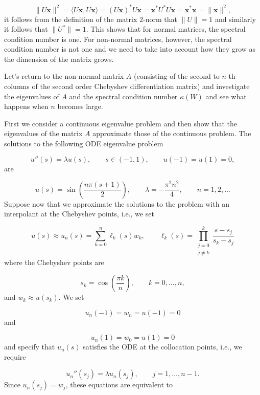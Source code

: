 \documentclass[12pt,landscape]{article}
\begin{document}
{\[
\| U\mathbf{x} \|^2 = \langle U\mathbf{x},  U\mathbf{x} \rangle = \left( U\mathbf{x} \right)^* U\mathbf{x} = \mathbf{x}^*U^*U\mathbf{x} = \mathbf{x}^*\mathbf{x} = \| \mathbf{x} \|^2,
\]
it follows from the definition of the matrix $2$-norm that $\| U \| = 1$ and similarly it follows that $\| U^* \| = 1$.  This shows that for normal matrices, the spectral condition number is one. For non-normal matrices, however, the spectral condition number is not one and we need to take into account how they grow as the dimension of the matrix grows.

Let's return to the non-normal matrix $A$ (consisting of the second to $n$-th columns of the second order Chebyshev differentiation matrix) and investigate the eigenvalues of $A$ and the spectral condition number $\kappa(W)$ and see what happens when $n$ becomes large.

First we consider a continuous eigenvalue problem and then show that the eigenvalues of the matrix $A$ approximate those of the continuous problem.  The solutions to the following ODE eigenvalue problem

\[
u''(s) = \lambda u(s),\qquad s \in (-1, 1), \qquad u(-1) = u(1) = 0,
\]
are

\[
u(s)  = \sin\left(\frac{n\pi(s+1)}{2}\right), \qquad \lambda = -\frac{\pi^2 n^2}{4}, \qquad n = 1, 2, \ldots
\]
Suppose now that we approximate the solutions to the problem with an interpolant at the Chebyshev points, i.e., we set

\[
u(s) \approx u_{n}(s) = \sum_{k = 0}^{n}\ell_k(s)w_k, \qquad \ell_k(s) = \prod_{\substack{j=0\\ j \neq k}}^{k}\frac{s-s_j}{s_k-s_j}
\]
where the Chebyshev points are

\[
s_k = \cos\left(\frac{\pi k}{n} \right), \qquad k = 0, \ldots, n,
\]
and $w_k \approx u(s_k)$.   We set 

\[
u_n(-1) = w_n = u(-1) = 0
\]
and

\[
u_n(1) = w_0 = u(1) = 0
\]
and specify that $u_n(s)$ satisfies the ODE at the collocation points, i.e., we require

\[
u_n''(s_j) = \lambda u_n(s_j), \qquad j = 1, \ldots, n-1.
\]
Since $u_n(s_j) = w_j$, these equations are equivalent to

}
\end{document}
